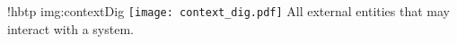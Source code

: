 \namedfigure
{!hbtp}
{img:contextDig}
{\texttt{[image: context\_dig.pdf]}}
{All external entities that may interact with a system.}
